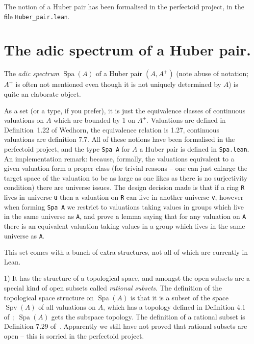 \documentclass{amsart}
\DeclareMathOperator{\Spa}{Spa}
\DeclareMathOperator{\Spv}{Spv}
\theoremstyle{plain}
\theoremstyle{remark}
\begin{document}
The notion of a Huber pair has been formalised in the perfectoid project, in the file {\tt Huber\_pair.lean}.

\section{The adic spectrum of a Huber pair.}

The \emph{adic spectrum} $\Spa(A)$ of a Huber pair $(A,A^+)$ (note abuse of notation; $A^+$ is often not mentioned even though it is not uniquely determined by $A$) is quite an elaborate object.

As a set (or a type, if you prefer), it is just the equivalence classes of continuous valuations on $A$ which are bounded by 1 on $A^+$. Valuations are defined in Definition~1.22 of Wedhorn, the equivalence relation is 1.27, continuous valuations are definition 7.7. All of these notions have been formalised in the perfectoid project, and the type {\tt Spa A} for $A$ a Huber pair is defined in {\tt Spa.lean}. An implementation remark: because, formally, the valuations equivalent to a given valuation form a proper class (for trivial reasons -- one can just enlarge the target space of the valuation to be as large as one likes as there is no surjectivity condition) there are universe issues. The design decision made is that if a ring {\tt R} lives in universe {\tt u} then a valuation on {\tt R} can live in another universe {\tt v}, however when forming {\tt Spa A} we restrict to valuations taking values in groups which live in the same universe as {\tt A}, and prove a lemma saying that for any valuation on {\tt A} there is an equivalent valuation taking values in a group which lives in the same universe as {\tt A}. 

This set comes with a bunch of extra structures, not all of which are currently in Lean.

1) It has the structure of a topological space, and amongst the open subsets are a special kind of open subsets called \emph{rational subsets}. The definition of the topological space structure on $\Spa(A)$ is that it is a subset of the space $\Spv(A)$ of all valuations on $A$, which has a topology defined in Definition 4.1 of~\cite{wedhorn}; $\Spa(A)$ gets the subspace topology. The definition of a rational subset is Definition 7.29 of~\cite{wedhorn}. Apparently we still have not proved that rational subsets are open -- this is sorried in the perfectoid project.
\end{document}

